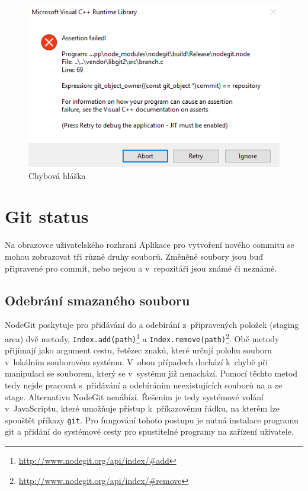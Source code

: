 \FloatBarrier
\begin{figure}[h]
	\centering
	\includegraphics[width=\textwidth]{sections/nodegit/images/branch.png}
	\caption{Chybová hláška}
\end{figure}
\FloatBarrier

\section{Git status}

Na obrazovce uživatelského rozhraní Aplikace pro vytvoření nového commitu se mohou zobrazovat tři různé druhy souborů. Změněné soubory jsou buď připravené pro commit, nebo nejsou a v~repozitáři jsou známé či neznámé.

\subsection{Odebrání smazaného souboru}

NodeGit poskytuje pro přidávání do a odebírání z~připravených položek (staging area) dvě metody, \texttt{Index.add(path)}\footnote{\url{http://www.nodegit.org/api/index/\#add}} a \texttt{Index.remove(path)}\footnote{\url{http://www.nodegit.org/api/index/\#remove}}. Obě metody přijímají jako argument cestu, řetězec znaků, které určují polohu souboru v~lokálním souborovém systému. V~obou případech dochází k~chybě při manipulaci se souborem, který se v~systému již nenachází. Pomocí těchto metod tedy nejde pracovat s~přidávání a odebíráním neexistujících souborů na a ze stage. Alternativu NodeGit nenábízí. Řešením je tedy systémové volání v~JavaScriptu, které umožňuje přístup k~příkazovému řádku, na kterém lze spouštět příkazy \texttt{git}. Pro fungování tohoto postupu je nutná instalace programu git a přidání do systémové cesty pro spustitelné programy na zařízení uživatele.

